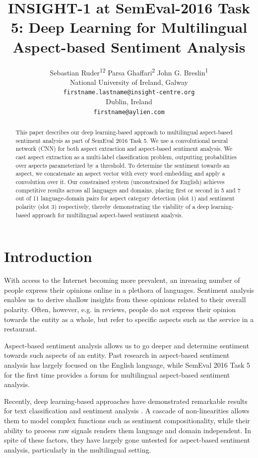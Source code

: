 \documentclass[11pt,letterpaper]{article}
\title{INSIGHT-1 at SemEval-2016 Task 5: Deep Learning for Multilingual Aspect-based Sentiment Analysis}
\author{Sebastian Ruder\textsuperscript{1}\textsuperscript{2}
	\And
		Parsa Ghaffari\textsuperscript{2}
		\And
		John G. Breslin\textsuperscript{1}
		\AND
	    \normalfont{\textsuperscript{1}Insight Centre for Data Analytics}\\
	    National University of Ireland, Galway\\
	    {\tt firstname.lastname@insight-centre.org}
	    \AND
	    \normalfont{\textsuperscript{2}Aylien Ltd.}\\
	    Dublin, Ireland\\
	    {\tt firstname@aylien.com}
  }
\date{}
\begin{document}
\maketitle

\begin{abstract}
This paper describes our deep learning-based approach to multilingual aspect-based sentiment analysis as part of SemEval 2016 Task 5. We use a convolutional neural network (CNN) for both aspect extraction and aspect-based sentiment analysis. We cast aspect extraction as a multi-label classification problem, outputting probabilities over aspects parameterized by a threshold. To determine the sentiment towards an aspect, we concatenate an aspect vector with every word embedding and apply a convolution over it.
Our constrained system (unconstrained for English) achieves competitive results across all languages and domains, placing first or second in 5 and 7 out of 11 language-domain pairs for aspect category detection (slot 1) and sentiment polarity (slot 3) respectively, thereby demonstrating the viability of a deep learning-based approach for multilingual aspect-based sentiment analysis.
\end{abstract}

\section{Introduction}

With access to the Internet becoming more prevalent, an inreasing number of people express their opinions online in a plethora of languages. Sentiment analysis \cite{Liu2012} enables us to derive shallow insights from these opinions related to their overall polarity. Often, however, e.g. in reviews, people do not express their opinion towards the entity as a whole, but refer to specific aspects such as the service in a restaurant.

Aspect-based sentiment analysis allows us to go deeper and determine sentiment towards such aspects of an entity. Past research in aspect-based sentiment analysis has largely focused on the English language, while SemEval 2016 Task 5 \cite{SemEval2016:task5} for the first time provides a forum for multilingual aspect-based sentiment analysis.

Recently, deep learning-based approaches have demonstrated remarkable results for text classification and sentiment analysis \cite{Kim2014}. A cascade of non-linearities allows them to model complex functions such as sentiment compositionality, while their ability to process raw signals renders them language and domain independent. In spite of these factors, they have largely gone untested for aspect-based sentiment analysis, particularly in the multilingual setting.
\end{document}
